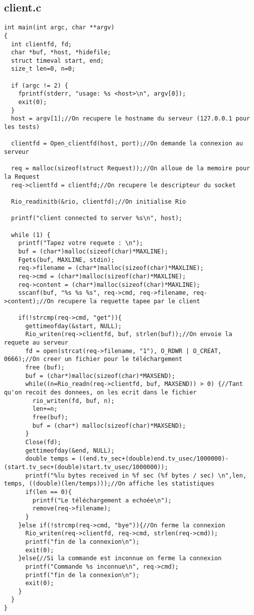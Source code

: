 \documentclass{report}
\begin{document}
      \subsection{client.c}
      \begin{lstlisting}
int main(int argc, char **argv)
{
  int clientfd, fd;
  char *buf, *host, *hidefile;
  struct timeval start, end;
  size_t len=0, n=0;

  if (argc != 2) {
    fprintf(stderr, "usage: %s <host>\n", argv[0]);
    exit(0);
  }
  host = argv[1];//On recupere le hostname du serveur (127.0.0.1 pour les tests)

  clientfd = Open_clientfd(host, port);//On demande la connexion au serveur

  req = malloc(sizeof(struct Request));//On alloue de la memoire pour la Request
  req->clientfd = clientfd;//On recupere le descripteur du socket

  Rio_readinitb(&rio, clientfd);//On initialise Rio

  printf("client connected to server %s\n", host);

  while (1) {
    printf("Tapez votre requete : \n");
    buf = (char*)malloc(sizeof(char)*MAXLINE);
    Fgets(buf, MAXLINE, stdin);
    req->filename = (char*)malloc(sizeof(char)*MAXLINE);
    req->cmd = (char*)malloc(sizeof(char)*MAXLINE);
    req->content = (char*)malloc(sizeof(char)*MAXLINE);
    sscanf(buf, "%s %s %s", req->cmd, req->filename, req->content);//On recupere la requette tapee par le client

    if(!strcmp(req->cmd, "get")){
      gettimeofday(&start, NULL);
      Rio_writen(req->clientfd, buf, strlen(buf));//On envoie la requete au serveur
      fd = open(strcat(req->filename, "1"), O_RDWR | O_CREAT, 0666);//On creer un fichier pour le téléchargement
      free (buf);
      buf = (char*)malloc(sizeof(char)*MAXSEND);
      while((n=Rio_readn(req->clientfd, buf, MAXSEND)) > 0) {//Tant qu'on recoit des donnees, on les ecrit dans le fichier
        rio_writen(fd, buf, n);
        len+=n;
        free(buf);
        buf = (char*) malloc(sizeof(char)*MAXSEND);
      }
      Close(fd);
      gettimeofday(&end, NULL);
      double temps = ((end.tv_sec+(double)end.tv_usec/1000000)-(start.tv_sec+(double)start.tv_usec/1000000));
      printf("%lu bytes received in %f sec (%f bytes / sec) \n",len, temps, ((double)(len/temps)));//On affiche les statistiques
      if(len == 0){
        printf("Le téléchargement a echoée\n");
        remove(req->filename);
      }
    }else if(!strcmp(req->cmd, "bye")){//On ferme la connexion
      Rio_writen(req->clientfd, req->cmd, strlen(req->cmd));
      printf("fin de la connexion\n");
      exit(0);
    }else{//Si la commande est inconnue on ferme la connexion
      printf("Commande %s inconnue\n", req->cmd);
      printf("fin de la connexion\n");
      exit(0);
    }
  }
}
      \end{lstlisting}
\end{document}
